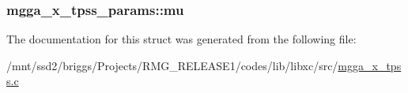 \hypertarget{structmgga__x__tpss__params_a54c1e683f0208ff264bf0b386414d4e2}{
\subsubsection[{mu}]{ mgga\-\_\-x\-\_\-tpss\-\_\-params\-::mu}}\label{structmgga__x__tpss__params_a54c1e683f0208ff264bf0b386414d4e2}


The documentation for this struct was generated from the following file\-:\begin{DoxyCompactItemize}
\item 
/mnt/ssd2/briggs/\-Projects/\-R\-M\-G\-\_\-\-R\-E\-L\-E\-A\-S\-E1/codes/lib/libxc/src/\hyperlink{mgga__x__tpss_8c}{mgga\-\_\-x\-\_\-tpss.\-c}\end{DoxyCompactItemize}
